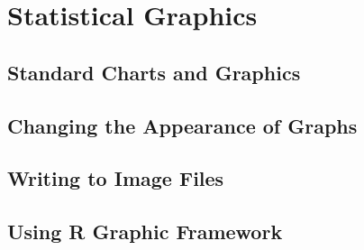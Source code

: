 \section{Statistical Graphics}
\subsection{Standard Charts and Graphics}
\subsection{Changing the Appearance of Graphs}
\subsection{Writing to Image Files}
\subsection{Using R Graphic Framework}
\endinput
